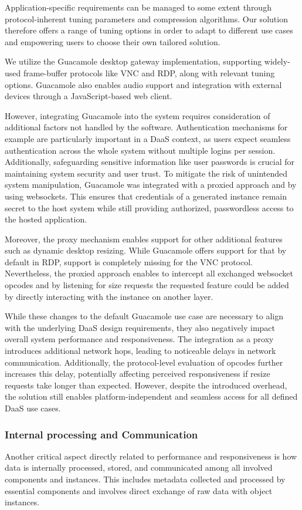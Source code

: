 \documentclass[runningheads]{llncs}
\begin{document}
Application-specific requirements can be managed to some extent
through protocol-inherent tuning parameters and compression algorithms.
Our solution therefore offers a range of tuning options
in order to adapt to different use cases
and empowering users to choose their own tailored solution.

We utilize the Guacamole desktop gateway implementation,
supporting widely-used frame-buffer protocols like VNC and RDP,
along with relevant tuning options.
Guacamole also enables audio support and integration with external devices
through a JavaScript-based web client.

However, integrating Guacamole into the system
requires consideration of additional factors not handled by the software.
Authentication mechanisms for example are particularly important in a DaaS context,
as users expect seamless authentication across the whole system
without multiple logins per session.
Additionally, safeguarding sensitive information like user passwords is crucial
for maintaining system security and user trust.
To mitigate the risk of unintended system manipulation,
Guacamole was integrated with a proxied approach and by using websockets.
This ensures that credentials of a generated instance remain secret to the host system
while still providing authorized, passwordless access to the hosted application.

Moreover, the proxy mechanism enables support for other additional features
such as dynamic desktop resizing.
While Guacamole offers support for that by default in RDP,
support is completely missing for the VNC protocol.
Nevertheless, the proxied approach enables to intercept all exchanged websocket opcodes
and by listening for size requests
the requested feature could be added
by directly interacting with the instance on another layer.

While these changes to the default Guacamole use case are necessary to align
with the underlying DaaS design requirements,
they also negatively impact overall system performance and responsiveness.
The integration as a proxy introduces additional network hops,
leading to noticeable delays in network communication.
Additionally, the protocol-level evaluation of opcodes further increases this delay,
potentially affecting perceived responsiveness
if resize requests take longer than expected.
However, despite the introduced overhead,
the solution still enables platform-independent
and seamless access for all defined DaaS use cases.

\subsubsection{Internal processing and Communication}
Another critical aspect directly related to performance and responsiveness
is how data is internally processed, stored, and communicated
among all involved components and instances.
This includes metadata collected and processed by essential components
and involves direct exchange of raw data with object instances.
\end{document}
